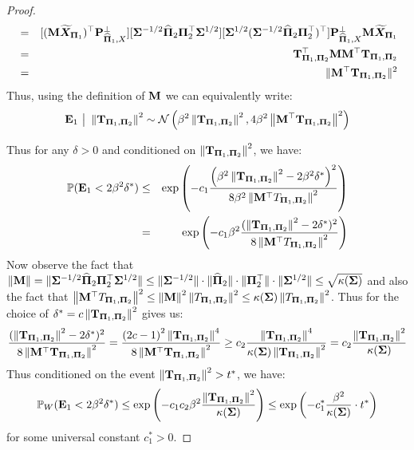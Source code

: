 \documentclass[numsec,webpdf,modern,medium,namedate]{oup-authoring-template}
\theoremstyle{thmstyleone}%
\theoremstyle{thmstyletwo}%
\theoremstyle{thmstylethree}%
\begin{document}
\begin{proof}
{\begin{eqnarray*}
        & = & [(\mathbf{M} \widetilde{\boldsymbol{X}}_{\boldsymbol{\Pi}_1})^\top\mathbf{P}_{\widehat{\boldsymbol{\Pi}}_1, X}^\perp][ {\boldsymbol{\Sigma}}^{-1/2} \widehat{\boldsymbol{\Pi}}_2 \boldsymbol{\Pi}_2^\top{\boldsymbol{\Sigma}}^{1/2}][  \boldsymbol{\Sigma}^{1/2}({\boldsymbol{\Sigma}}^{-1/2} \widehat{\boldsymbol{\Pi}}_2 \boldsymbol{\Pi}_2^\top)^\top ]\mathbf{P}_{\widehat{\boldsymbol{\Pi}}_1, X}^\perp \mathbf{M} \widetilde{\boldsymbol{X}}_{\boldsymbol{\Pi}_1}\\
        & = & \mathbf{T}_{\boldsymbol{\Pi}_1, \boldsymbol{\Pi}_2}^\top \mathbf{M}\mathbf{M}^\top \mathbf{T}_{\boldsymbol{\Pi}_1, \boldsymbol{\Pi}_2}\\
        & = & \|\mathbf{M}^\top \mathbf{T}_{\boldsymbol{\Pi}_1, \boldsymbol{\Pi}_2}\|^2
    \end{eqnarray*}}
    Thus, using the definition of $\mathbf{M}$ we can equivalently write:
    \begin{eqnarray*}
        \mathbf{E}_1\ \big|\ \left\|\mathbf{T}_{\boldsymbol{\Pi}_1, \boldsymbol{\Pi}_2} \right\|^2  \sim \mathcal{N} \left(\beta^2 \left\|\mathbf{T}_{\boldsymbol{\Pi}_1, \boldsymbol{\Pi}_2} \right\|^2, 4\beta^2 \left\|\mathbf{M}^\top \mathbf{T}_{\boldsymbol{\Pi}_1, \boldsymbol{\Pi}_2}\right\|^2 \right) 
    \end{eqnarray*}


 Thus for any $\delta > 0$ and conditioned on $\left\|\mathbf{T}_{\boldsymbol{\Pi}_1, \boldsymbol{\Pi}_2} \right\|^2$, we have:
 \begin{eqnarray*}
     \mathbb{P}(\mathbf{E}_1 <2\beta^2\delta^\ast) & \leq & \exp\left(-c_1\dfrac{\left(\beta^2\left\|\mathbf{T}_{\boldsymbol{\Pi}_1, \boldsymbol{\Pi}_2} \right\|^2 - 2 \beta^2\delta^\ast\right)^2}{8\beta^2\left\|\mathbf{M}^\top T_{\boldsymbol{\Pi}_1, \boldsymbol{\Pi}_2}\right\|^2}\right)\\
     & = & \exp\left(-c_1\beta^2\dfrac{(\left\|\mathbf{T}_{\boldsymbol{\Pi}_1, \boldsymbol{\Pi}_2} \right\|^2 - 2 \delta^\ast)^2}{8\left\|\mathbf{M}^\top T_{\boldsymbol{\Pi}_1, \boldsymbol{\Pi}_2}\right\|^2}\right)
 \end{eqnarray*}
Now observe the fact that $\|\mathbf{M}\| = \|{\boldsymbol{\Sigma}}^{-1/2} \widehat{\boldsymbol{\Pi}}_2 \boldsymbol{\Pi}_2^\top {\boldsymbol{\Sigma}}^{1/2}\| \leq \|{\boldsymbol{\Sigma}}^{-1/2} \|\cdot \|\widehat{\boldsymbol{\Pi}}_2\|\cdot \| \boldsymbol{\Pi}_2^\top\| \cdot\|{\boldsymbol{\Sigma}}^{1/2}\|\leq \sqrt{\kappa(\boldsymbol{\Sigma})}$ and also the fact that $\left\|\mathbf{M}^\top T_{\boldsymbol{\Pi}_1, \boldsymbol{\Pi}_2}\right\|^2 \leq \left\|\mathbf{M}\right\|^2 \left\| T_{\boldsymbol{\Pi}_1, \boldsymbol{\Pi}_2}\right\|^2 \leq \kappa(\boldsymbol{\Sigma})\left\| T_{\boldsymbol{\Pi}_1, \boldsymbol{\Pi}_2}\right\|^2$. Thus for the choice of $\delta^\ast = c\left\|\mathbf{T}_{\boldsymbol{\Pi}_1, \boldsymbol{\Pi}_2} \right\|^2$ gives us:
\begin{eqnarray*}
    \dfrac{(\left\|\mathbf{T}_{\boldsymbol{\Pi}_1, \boldsymbol{\Pi}_2} \right\|^2 - 2 \delta^\ast)^2}{8\left\|\mathbf{M}^\top \mathbf{T}_{\boldsymbol{\Pi}_1, \boldsymbol{\Pi}_2}\right\|^2} =\dfrac{\left(2c-1\right)^2\left\|\mathbf{T}_{\boldsymbol{\Pi}_1, \boldsymbol{\Pi}_2} \right\|^4}{8\left\|\mathbf{M}^\top \mathbf{T}_{\boldsymbol{\Pi}_1, \boldsymbol{\Pi}_2}\right\|^2}
    \geq  c_2\dfrac{\left\|\mathbf{T}_{\boldsymbol{\Pi}_1, \boldsymbol{\Pi}_2} \right\|^4}{\kappa(\boldsymbol{\Sigma})\left\| \mathbf{T}_{\boldsymbol{\Pi}_1, \boldsymbol{\Pi}_2}\right\|^2} = c_2\dfrac{\left\|\mathbf{T}_{\boldsymbol{\Pi}_1, \boldsymbol{\Pi}_2} \right\|^2}{\kappa(\boldsymbol{\Sigma})}\\
\end{eqnarray*}
Thus conditioned on the event $\left\|\mathbf{T}_{\boldsymbol{\Pi}_1, \boldsymbol{\Pi}_2} \right\|^2> t^\ast$, we have:
\begin{equation*}
    \mathbb{P}_W(\mathbf{E}_1 <2\beta^2\delta^\ast) \leq \exp\left(-c_1c_2\beta^2 \dfrac{\left\|\mathbf{T}_{\boldsymbol{\Pi}_1, \boldsymbol{\Pi}_2} \right\|^2}{\kappa(\boldsymbol{\Sigma})}\right) \leq \exp\left(-c_1^\ast\dfrac{\beta^2}{\kappa(\boldsymbol{\Sigma})}\cdot t^\ast\right)
\end{equation*}
for some universal constant $c_1^\ast >0$.
 \end{proof}
\end{document}
